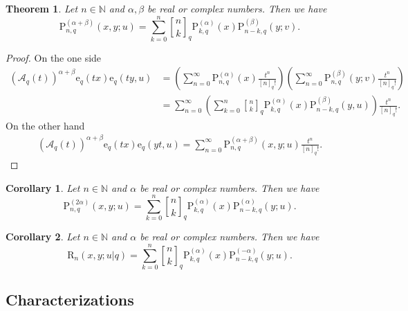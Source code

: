 \documentclass[12pt]{article}
\newcommand{\qbinom}{\genfrac{[}{]}{0pt}{}}
\newcommand{\N}{\mathbb{N}}
\newcommand{\e}{\mathrm{e}}
\newcommand{\A}{\mathcal{A}}
\newcommand{\p}{\mathrm{P}}
\newcommand{\rr}{\mathrm{R}}
\newtheorem{theorem}{Theorem}
\newtheorem{corollary}{Corollary}
\begin{document}
\begin{theorem}\label{theo_iden9}
Let $n\in\N$ and $\alpha,\beta$ be real or complex numbers. Then we have
    \begin{equation}
        \p_{n,q}^{(\alpha+\beta)}(x,y;u)=\sum_{k=0}^{n}\qbinom{n}{k}_{q}\p_{k,q}^{(\alpha)}(x)\p_{n-k,q}^{(\beta)}(y;v).
    \end{equation}
\end{theorem}
\begin{proof}
On the one side
    \begin{align*}
        (\A_{q}(t))^{\alpha+\beta}\e_{q}(tx)\e_{q}(ty,u)&=\left(\sum_{n=0}^{\infty}\p_{n,q}^{(\alpha)}(x)\frac{t^n}{[n]_{q}!}\right)\left(\sum_{n=0}^{\infty}\p_{n,q}^{(\beta)}(y;v)\frac{t^{n}}{[n]_{q}!}\right)\\
        &=\sum_{n=0}^{\infty}\left(\sum_{k=0}^{n}\qbinom{n}{k}_{q}\p_{k,q}^{(\alpha)}(x)\p_{n-k,q}^{(\beta)}(y,u)\right)\frac{t^n}{[n]_{q}!}.
    \end{align*}
On the other hand
\begin{align*}
    (\A_{q}(t))^{\alpha+\beta}\e_{q}(tx)\e_{q}(yt,u)=\sum_{n=0}^{\infty}\p_{n,q}^{(\alpha+\beta)}(x,y;u)\frac{t^{n}}{[n]_{q}!}.
\end{align*}
\end{proof}

\begin{corollary}
Let $n\in\N$ and $\alpha$ be real or complex numbers. Then we have
    \begin{equation}
        \p_{n,q}^{(2\alpha)}(x,y;u)=\sum_{k=0}^{n}\qbinom{n}{k}_{q}\p_{k,q}^{(\alpha)}(x)\p_{n-k,q}^{(\alpha)}(y;u).
    \end{equation}
\end{corollary}

\begin{corollary}
Let $n\in\N$ and $\alpha$ be real or complex numbers. Then we have
    \begin{equation}
        \rr_{n}(x,y;u|q)=\sum_{k=0}^{n}\qbinom{n}{k}_{q}\p_{k,q}^{(\alpha)}(x)\p_{n-k,q}^{(-\alpha)}(y;u).
    \end{equation}
\end{corollary}


\subsection{Characterizations}
\end{document}
